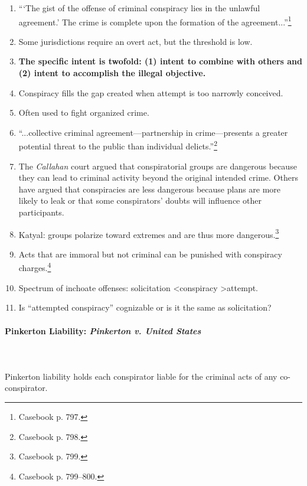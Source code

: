 \begin{enumerate}
    \item ```The gist of the offense of criminal conspiracy lies in the 
    unlawful agreement.' The crime is complete upon the formation of the 
    agreement...''\footnote{Casebook p. 797.}
    \item Some jurisdictions require an overt act, but the threshold is low.
    \item \textbf{The specific intent is twofold: (1) intent to combine with 
    others and (2) intent to accomplish the illegal objective.}
    \item Conspiracy fills the gap created when attempt is too narrowly 
    conceived.
    \item Often used to fight organized crime.
    \item ``...collective criminal agreement---partnership in crime---presents 
    a greater potential threat to the public than individual 
    delicts.''\footnote{Casebook p. 798.}
    \item The \emph{Callahan} court argued that conspiratorial groups are 
    dangerous because they can lead to criminal activity beyond the original 
    intended crime. Others have argued that conspiracies are less dangerous 
    because plans are more likely to leak or that some conspirators' doubts 
    will influence other participants.
    \item Katyal: groups polarize toward extremes and are thus more 
    dangerous.\footnote{Casebook p. 799.}
    \item Acts that are immoral but not criminal can be punished with 
    conspiracy charges.\footnote{Casebook p. 799--800.}
    \item Spectrum of inchoate offenses: solicitation \textless conspiracy 
    \textgreater attempt.
    \item Is ``attempted conspiracy'' cognizable or is it the same as 
    solicitation?
\end{enumerate}

\paragraph{Pinkerton Liability: \emph{Pinkerton v. United States}}
~\\\\
Pinkerton liability holds each conspirator liable for the criminal acts of any 
co-conspirator.

